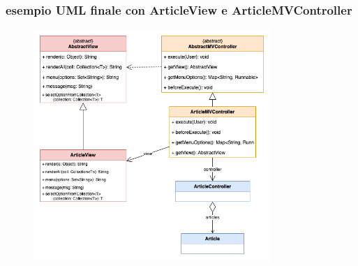 \begin{frame}
    \frametitle{esempio UML finale con ArticleView e ArticleMVController}
    \begin{figure}
        \includegraphics[width=0.8\textwidth]{img/modello-vista_after.png}
    \end{figure}
\end{frame}
